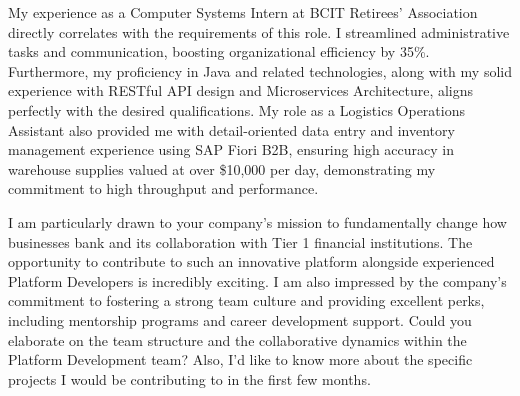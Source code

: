 \documentclass[letterpaper,11pt]{article}
\begin{document}
My experience as a Computer Systems Intern at BCIT Retirees’ Association directly correlates with the requirements of this role. I streamlined administrative tasks and communication, boosting organizational efficiency by 35\%. Furthermore, my proficiency in Java and related technologies, along with my solid experience with RESTful API design and Microservices Architecture, aligns perfectly with the desired qualifications. My role as a Logistics Operations Assistant also provided me with detail-oriented data entry and inventory management experience using SAP Fiori B2B, ensuring high accuracy in warehouse supplies valued at over \$10,000 per day, demonstrating my commitment to high throughput and performance.
\vspace{10pt}

I am particularly drawn to your company's mission to fundamentally change how businesses bank and its collaboration with Tier 1 financial institutions. The opportunity to contribute to such an innovative platform alongside experienced Platform Developers is incredibly exciting. I am also impressed by the company's commitment to fostering a strong team culture and providing excellent perks, including mentorship programs and career development support. Could you elaborate on the team structure and the collaborative dynamics within the Platform Development team? Also, I'd like to know more about the specific projects I would be contributing to in the first few months.
\vspace{10pt}
\end{document}
